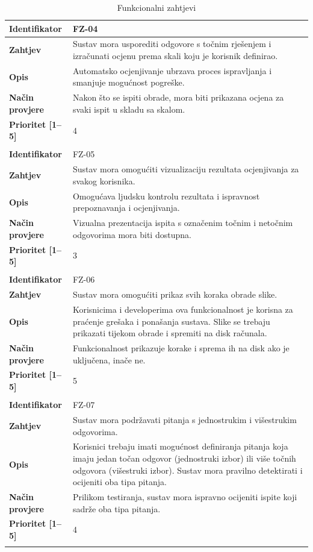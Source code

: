 \documentclass{foi}
\begin{document}
\begin{longtable}{|l|p{12cm}|}
    \textbf{Identifikator} & FZ-04 \\ \hline
    \textbf{Zahtjev} & Sustav mora usporediti odgovore s točnim rješenjem i izračunati ocjenu prema skali koju je korisnik definirao. \\ \hline
    \textbf{Opis} & Automatsko ocjenjivanje ubrzava proces ispravljanja i smanjuje mogućnost pogreške. \\ \hline
    \textbf{Način provjere} & Nakon što se ispiti obrade, mora biti prikazana ocjena za svaki ispit u skladu sa skalom. \\ \hline
    \textbf{Prioritet [1--5]} & 4 \\ \hline
    \multicolumn{2}{|c|}{} \\ \hline
    \pagebreak
    \hline

    \textbf{Identifikator} & FZ-05 \\ \hline
    \textbf{Zahtjev} & Sustav mora omogućiti vizualizaciju rezultata ocjenjivanja za svakog korisnika. \\ \hline
    \textbf{Opis} & Omogućava ljudsku kontrolu rezultata i ispravnost prepoznavanja i ocjenjivanja. \\ \hline
    \textbf{Način provjere} & Vizualna prezentacija ispita s označenim točnim i netočnim odgovorima mora biti dostupna. \\ \hline
    \textbf{Prioritet [1--5]} & 3 \\ \hline
    \multicolumn{2}{|c|}{} \\ \hline
    
    \textbf{Identifikator} & FZ-06 \\ \hline
    \textbf{Zahtjev} & Sustav mora omogućiti prikaz svih koraka obrade slike. \\ \hline
    \textbf{Opis} & Korisnicima i developerima ova funkcionalnost je korisna za praćenje grešaka i ponašanja sustava. Slike se trebaju prikazati tijekom obrade i spremiti na disk računala. \\ \hline
    \textbf{Način provjere} & Funkcionalnost prikazuje korake i sprema ih na disk ako je uključena, inače ne. \\ \hline
    \textbf{Prioritet [1--5]} & 5  \\ \hline
    \multicolumn{2}{|c|}{} \\ \hline
    \textbf{Identifikator} & FZ-07 \\ \hline
    \textbf{Zahtjev} & Sustav mora podržavati pitanja s jednostrukim i višestrukim odgovorima. \\ \hline
    \textbf{Opis} & Korisnici trebaju imati mogućnost definiranja pitanja koja imaju jedan točan odgovor (jednostruki izbor) ili više točnih odgovora (višestruki izbor). Sustav mora pravilno detektirati i ocijeniti oba tipa pitanja. \\ \hline
    \textbf{Način provjere} & Prilikom testiranja, sustav mora ispravno ocijeniti ispite koji sadrže oba tipa pitanja. \\ \hline
    \textbf{Prioritet [1--5]} & 4 \\ \hline
    \caption{Funkcionalni zahtjevi}
\end{longtable}
\end{document}
